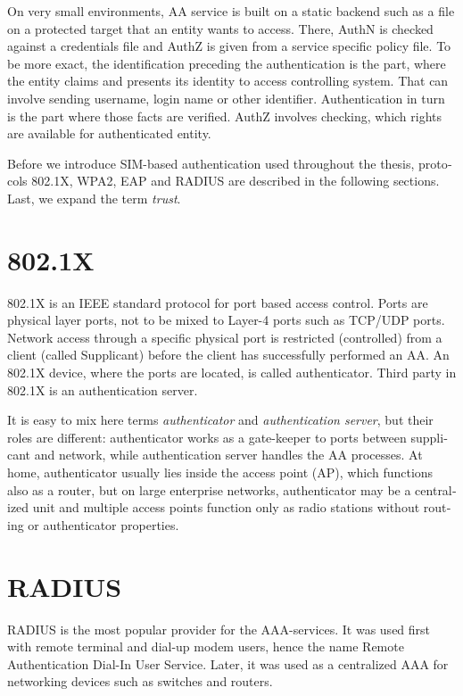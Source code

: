 \documentclass[12pt,a4paper,english]{tutthesis}
\begin{document}
\begin{otherlanguage}{english}
On very small environments, AA service is built on a static backend such
as a file on a protected target that an entity wants to access. There, AuthN
is checked against a credentials file and AuthZ is given from a service
specific policy file. 
To be more exact, the identification preceding the authentication is the part,
where the entity claims and presents its identity to 
access controlling system. That can involve sending username, login
name or other identifier. Authentication in turn is the part where
those facts are verified. AuthZ involves checking, which rights are 
available for authenticated entity. 


Before we introduce SIM-based authentication used throughout the
thesis, protocols 802.1X, WPA2, EAP and RADIUS are described in the
following sections. Last, we expand the term \emph{trust}.

\section{802.1X}
\label{sec-2-1}

802.1X\cite{8021X} is an IEEE standard protocol for port based access
control. Ports are physical layer ports, not to be mixed to Layer-4 ports such as TCP/UDP ports.
 Network access through a specific physical port is
restricted (controlled) from a client (called Supplicant) before
the client has successfully performed an AA. An 802.1X device, where
the ports are located, is called  authenticator. Third party in 802.1X is an
authentication server. 



It is easy to mix here terms \emph{authenticator} and \emph{authentication
server}, but their roles are different: authenticator works as a
gate-keeper to ports between supplicant and network, while
authentication server handles the AA processes.
At home, authenticator usually lies inside the access point (AP),
which functions also as a router, but 
on large enterprise networks, authenticator may be a centralized unit 
and multiple access points function only as radio stations without
routing or authenticator properties.



\section{RADIUS}
\label{sec-2-2}
\label{sec:radius}
RADIUS is the most popular provider for the 
AAA-services\cite[p.75]{radius-popular}.  It was used first with remote terminal
and dial-up modem users, hence the name Remote Authentication Dial-In
User Service. Later, it was used as a centralized AAA for networking
devices such as switches and routers.  











\end{otherlanguage}
\end{document}
